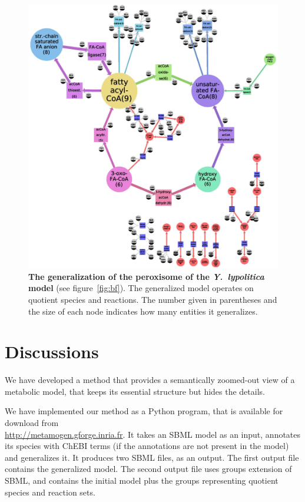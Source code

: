 \documentclass[9pt]{article}
\newcounter{fig}
\newcounter{rm}
\begin{document}
\begin{figure}[th]
\centerline{\includegraphics{Zhukova_Fig_3.eps}}
\vspace*{8pt}
\caption{\textbf{The generalization of the peroxisome of the \textit{Y.~lypolitica} model} (see figure~\ref{fig:bf}). The generalized model operates on quotient species and reactions. The number given in parentheses and the size of each node indicates how many entities it generalizes.}
\label{fig:yali}
\end{figure}

\newpage
\section*{Discussions}

We have developed a method that provides a semantically zoomed-out view of a metabolic model, that keeps its essential structure but hides the details. 

We have implemented our method as a Python program, that is available for download from\\ \url{http://metamogen.gforge.inria.fr}. It takes an SBML model as an input, annotates its species with ChEBI terms (if the annotations are not present in the model) and generalizes it. It produces two SBML files, as an output. The first output file contains the generalized model. The second output file uses groups\citep{Hucka2012} extension of SBML, and contains the initial model plus the groups representing quotient species and reaction sets.
\end{document}
